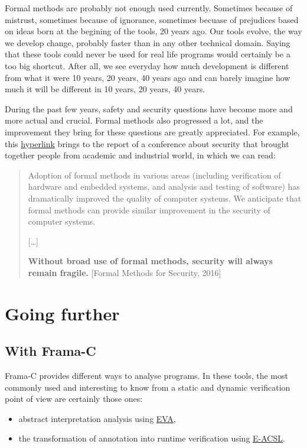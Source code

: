 \documentclass[12pt,francais,]{scrbook}
\providecommand{\tightlist}{%
  \setlength{\itemsep}{0pt}\setlength{\parskip}{0pt}}
\begin{document}
Formal methods are probably not enough used currently. Sometimes because
of mistrust, sometimes because of ignorance, sometimes becuase of
prejudices based on ideas born at the begining of the tools, 20 years
ago. Our tools evolve, the way we develop change, probably faster than
in any other technical domain. Saying that these tools could never be
used for real life programs would certainly be a too big shortcut. After
all, we see everyday how much development is different from what it were
10 years, 20 years, 40 years ago and can barely imagine how much it will
be different in 10 years, 20 years, 40 years.

During the past few years, safety and security questions have become
more and more actual and crucial. Formal methods also progressed a lot,
and the improvement they bring for these questions are greatly
appreciated. For example, this
\href{http://sfm.seas.harvard.edu/report.html}{hyperlink} brings to the
report of a conference about security that brought together people from
academic and industrial world, in which we can read:

\begin{quote}
Adoption of formal methods in various areas (including verification of
hardware and embedded systems, and analysis and testing of software) has
dramatically improved the quality of computer systems. We anticipate
that formal methods can provide similar improvement in the security of
computer systems.

{[}\ldots{}{]}

\textbf{Without broad use of formal methods, security will always remain
fragile.} \hfill{[}Formal Methods for Security, 2016{]}
\end{quote}

\chapter{Going further}\label{going-further}

\section{With Frama-C}\label{with-frama-c}

Frama-C provides different ways to analyse programs. In these tools, the
most commonly used and interesting to know from a static and dynamic
verification point of view are certainly those ones:

\begin{itemize}
\tightlist
\item
  abstract interpretation analysis using
  \href{http://frama-c.com/value.html}{EVA},
\item
  the transformation of annotation into runtime verification using
  \href{http://frama-c.com/eacsl.html}{E-ACSL}.
\end{itemize}
\end{document}
